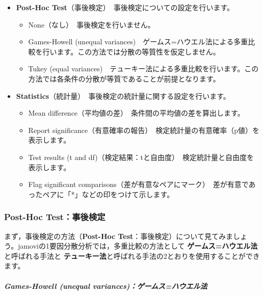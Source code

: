 \documentclass[
  12pt,
  a5jpaper,
  lualatex, ja=standard]{bxjsbook}
\providecommand{\tightlist}{%
  \setlength{\itemsep}{0pt}\setlength{\parskip}{0pt}}
\renewcommand{\emph}[1]{\textbf{\color{emph} #1}}
\newenvironment{jmvsettings}{%
	\begin{center}%
	\begin{tcolorbox}[%
		title=設定項目,
		colframe=gmoji,
		colbacktitle=gmoji,
		colback=gmoji!2!white,
		breakable,
		width=.9\textwidth,
		]\small\addtolength{\leftmargini}{-3\labelsep}%
	}%
	{\end{tcolorbox}\end{center}}
\begin{document}
\begin{jmvsettings}

\begin{itemize}
\tightlist
\item
  \textbf{Post-Hoc Test}（事後検定）　事後検定についての設定を行います。

  \begin{itemize}
  \tightlist
  \item
    None（なし）　事後検定を行いません。
  \item
    Games-Howell (unequal variances)　ゲームス=ハウエル法による多重比較を行います。この方法では分散の等質性を仮定しません。
  \item
    Tukey (equal variances)　テューキー法による多重比較を行います。この方法では各条件の分散が等質であることが前提となります。
  \end{itemize}
\item
  \textbf{Statistics}（統計量）　事後検定の統計量に関する設定を行います。

  \begin{itemize}
  \tightlist
  \item
    Mean difference（平均値の差）　条件間の平均値の差を算出します。
  \item
    Report significance（有意確率の報告）　検定統計量の有意確率（p値）を表示します。
  \item
    Test results (t and df)（検定結果：tと自由度）　検定統計量と自由度を表示します。
  \item
    Flag significant comparisons（差が有意なペアにマーク）　差が有意であったペアに「*」などの印をつけて示します。
  \end{itemize}
\end{itemize}

\end{jmvsettings}

\hypertarget{post-hoc-testux4e8bux5f8cux691cux5b9a}{%
\subsubsection*{Post-Hoc Test：事後検定}\label{post-hoc-testux4e8bux5f8cux691cux5b9a}}

まず，事後検定の方法（\textbf{Post-Hoc Test}：事後検定）について見てみましょう。jamoviの1要因分散分析では，多重比較の方法として\emph{ゲームス=ハウエル法}と呼ばれる手法と\emph{テューキー法}と呼ばれる手法の2とおりを使用することができます。

\hypertarget{games-howell-unequal-variancesux30b2ux30fcux30e0ux30b9ux30cfux30a6ux30a8ux30ebux6cd5}{%
\subparagraph*{Games-Howell (unequal variances)：ゲームス=ハウエル法}\label{games-howell-unequal-variancesux30b2ux30fcux30e0ux30b9ux30cfux30a6ux30a8ux30ebux6cd5}}
\end{document}
